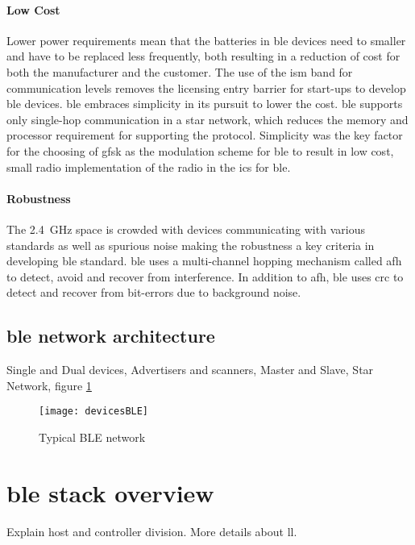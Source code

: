 \paragraph{Low Cost} Lower power requirements mean that the batteries in \gls{ble} devices need to smaller and have to be replaced less frequently, both resulting in a reduction of cost for both the manufacturer and the customer. The use of the \gls{ism} band for communication levels removes the licensing entry barrier for start-ups to develop \gls{ble} devices. \gls{ble} embraces simplicity in its pursuit to lower the cost. \gls{ble} supports only single-hop communication in a star network, which reduces the memory and processor requirement for supporting the protocol. Simplicity was the key factor for the choosing of \gls{gfsk} as the modulation scheme for \gls{ble} to result in low cost, small radio implementation of the radio in the \glspl{ic} for \gls{ble}. 
\paragraph{Robustness} The 2.4~\si{\GHz} space is crowded with devices communicating with various standards as well as spurious noise making the robustness a key criteria in developing \gls{ble} standard. \gls{ble} uses a multi-channel hopping mechanism called \gls{afh} to detect, avoid and recover from interference. In addition to \gls{afh}, \gls{ble} uses \gls{crc} to detect and recover from bit-errors due to background noise.

\subsection{\gls{ble} network architecture}
Single and Dual devices,
Advertisers and scanners,
Master and Slave,
Star Network,
figure \ref{devicesBLE}
\begin{figure}[h] %
  \begin{center}
	\texttt{[image: devicesBLE]}
  \end{center}
\caption{Typical BLE network}
\label{devicesBLE}
\end{figure}

\section{\gls{ble} stack overview}
Explain host and controller division. More details about \gls{ll}.

